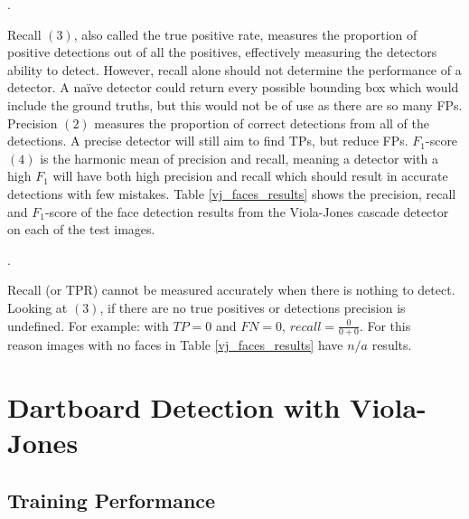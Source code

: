 \documentclass[11pt]{article}
\begin{document}
{\color{white}.}

Recall $(3)$, also called the true positive rate, measures the proportion of positive detections out of all the positives, effectively measuring the detectors ability to detect. However, recall alone should not determine the performance of a detector. A na\"ive detector could return every possible bounding box which would include the ground truths, but this would not be of use as there are so many FPs. Precision $(2)$ measures the proportion of correct detections from all of the detections. A precise detector will still aim to find TPs, but reduce FPs. $F_1$-score $(4)$ is the harmonic mean of precision and recall, meaning a detector with a high $F_1$ will have both high precision and recall which should result in accurate detections with few mistakes. Table \ref{vj_faces_results} shows the precision, recall and $F_1$-score of the face detection results from the Viola-Jones cascade detector on each of the test images.

{\color{white}.}

Recall (or TPR) cannot be measured accurately when there is nothing to detect. Looking at $(3)$, if there are no true positives or detections precision is undefined. For example: with $TP = 0$ and $FN = 0$, $recall = \frac{0}{0+0}$. For this \\ reason images with no faces in Table \ref{vj_faces_results} have $n/a$ results.

\newpage

\section{Dartboard Detection with Viola-Jones}
\label{own_detector}

\subsection{Training Performance}
\label{training_performance} 

\end{document}
